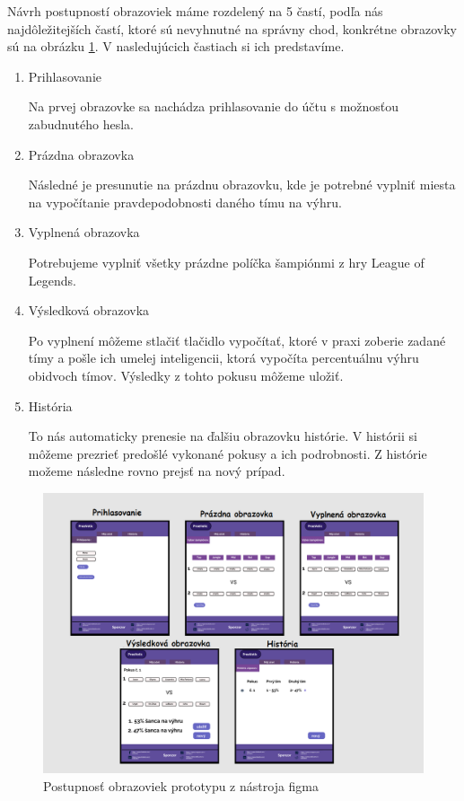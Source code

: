 Návrh postupností obrazoviek máme rozdelený na 5 častí, podľa nás najdôležitejších častí, ktoré sú nevyhnutné na správny chod, konkrétne obrazovky sú na obrázku \ref{jednanula}. V nasledujúcich častiach si ich predstavíme.
\begin{enumerate}
\item Prihlasovanie

Na prvej obrazovke sa nachádza prihlasovanie do účtu s možnosťou zabudnutého hesla.

\item Prázdna obrazovka

Následné je presunutie na prázdnu obrazovku, kde je potrebné vyplniť miesta na vypočítanie pravdepodobnosti daného tímu na výhru.

\item Vyplnená obrazovka

Potrebujeme vyplniť všetky prázdne políčka šampiónmi z hry League of Legends.

\item Výsledková obrazovka

Po vyplnení môžeme stlačiť tlačidlo vypočítať, ktoré v praxi zoberie zadané tímy a pošle ich umelej inteligencii, ktorá vypočíta percentuálnu výhru obidvoch tímov. Výsledky z tohto pokusu môžeme uložiť.

\item História

To nás automaticky prenesie na ďalšiu obrazovku histórie. V histórii si môžeme prezrieť predošlé vykonané pokusy a ich podrobnosti. Z histórie možeme následne rovno prejsť na nový prípad.
\end{enumerate}
\begin{figure}[h!]
	
	\includegraphics[width=.9\textwidth]{figures/postupnost}
	
	\centering
	
	\caption{ Postupnosť obrazoviek prototypu z nástroja figma \label{jednanula}}
	
\end{figure}

